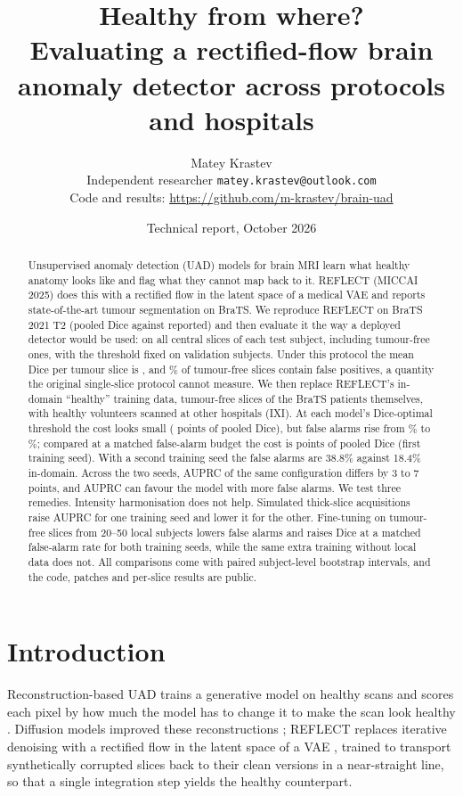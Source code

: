 \documentclass[10pt]{article}
\title{Healthy from where?\\[2pt]\large Evaluating a rectified-flow brain anomaly detector across protocols and hospitals}
\author{Matey Krastev\\\small Independent researcher \quad \texttt{matey.krastev@outlook.com}\\
\small Code and results: \url{https://github.com/m-krastev/brain-uad}}
\date{Technical report, October 2026}
\begin{document}
\maketitle

\begin{abstract}
Unsupervised anomaly detection (UAD) models for brain MRI learn what healthy anatomy looks like and flag what they cannot map back to it.
REFLECT (MICCAI 2025) does this with a rectified flow in the latent space of a medical VAE and reports state-of-the-art tumour segmentation on BraTS.
We reproduce REFLECT on BraTS 2021 T2 (pooled Dice \BratsReflectPooled{} against \PaperDice{} reported) and then evaluate it the way a deployed detector would be used: on all central slices of each test subject, including tumour-free ones, with the threshold fixed on validation subjects.
Under this protocol the mean Dice per tumour slice is \BratsStrictMean{}, and \BratsFA{}\% of tumour-free slices contain false positives, a quantity the original single-slice protocol cannot measure.
We then replace REFLECT's in-domain ``healthy'' training data, tumour-free slices of the BraTS patients themselves, with healthy volunteers scanned at other hospitals (IXI).
At each model's Dice-optimal threshold the cost looks small (\IxiDiceOptDrop{} points of pooled Dice), but false alarms rise from \BratsFA{}\% to \IxiFA{}\%; compared at a matched false-alarm budget the cost is \IxiMatchedDrop{} points of pooled Dice (first training seed). With a second training seed the false alarms are 38.8\% against 18.4\% in-domain.
Across the two seeds, AUPRC of the same configuration differs by 3 to 7 points, and AUPRC can favour the model with more false alarms.
We test three remedies. Intensity harmonisation does not help. Simulated thick-slice acquisitions raise AUPRC for one training seed and lower it for the other. Fine-tuning on tumour-free slices from 20--50 local subjects lowers false alarms and raises Dice at a matched false-alarm rate for both training seeds, while the same extra training without local data does not.
All comparisons come with paired subject-level bootstrap intervals, and the code, patches and per-slice results are public.
\end{abstract}

\section{Introduction}
Reconstruction-based UAD trains a generative model on healthy scans and scores each pixel by how much the model has to change it to make the scan look healthy \citep{baur2021autoencoders,lagogiannis2024deepdive}.
Diffusion models improved these reconstructions \citep{wyatt2022anoddpm,pinaya2022fast,behrendt2023pddpm}; REFLECT \citep{beizaee2025reflect} replaces iterative denoising with a rectified flow \citep{liu2023rectified} in the latent space of a VAE \citep{rombach2022ldm}, trained to transport synthetically corrupted slices back to their clean versions in a near-straight line, so that a single integration step yields the healthy counterpart.
\end{document}
